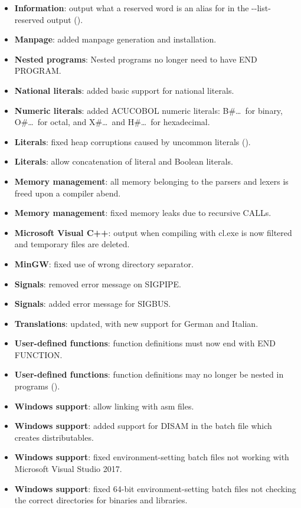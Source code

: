 \begin{itemize}
\item \textbf{Information}: output what a reserved word is an alias for in the -{}-list-reserved output ().
\item \textbf{Manpage}: added manpage generation and installation.
\item \textbf{Nested programs}: Nested programs no longer need to have END PROGRAM.
\item \textbf{National literals}: added basic support for national literals.
\item \textbf{Numeric literals}: added ACUCOBOL numeric literals: B\#\ldots\, for binary, O\#\ldots\, for octal, and X\#\ldots\ and H\#\ldots\, for hexadecimal.
\item \textbf{Literals}: fixed heap corruptions caused by uncommon literals ().
\item \textbf{Literals}: allow concatenation of literal and Boolean literals.
\item \textbf{Memory management}: all memory belonging to the parsers and lexers is freed upon a compiler abend.
\item \textbf{Memory management}: fixed memory leaks due to recursive CALLs.
\item \textbf{Microsoft Visual C++}: output when compiling with cl.exe is now filtered and temporary files are deleted.
\item \textbf{MinGW}: fixed use of wrong directory separator.
\item \textbf{Signals}: removed error message on SIGPIPE.
\item \textbf{Signals}: added error message for SIGBUS.
\item \textbf{Translations}: updated, with new support for German and Italian.
\item \textbf{User-defined functions}: function definitions must now end with END FUNCTION.
\item \textbf{User-defined functions}: function definitions may no longer be nested in programs ().
\item \textbf{Windows support}: allow linking with asm files.
\item \textbf{Windows support}: added support for DISAM in the batch file which creates distributables.
\item \textbf{Windows support}: fixed environment-setting batch files not working with Microsoft Visual Studio 2017.
\item \textbf{Windows support}: fixed 64-bit environment-setting batch files not checking the correct directories for binaries and libraries.
\end{itemize}

